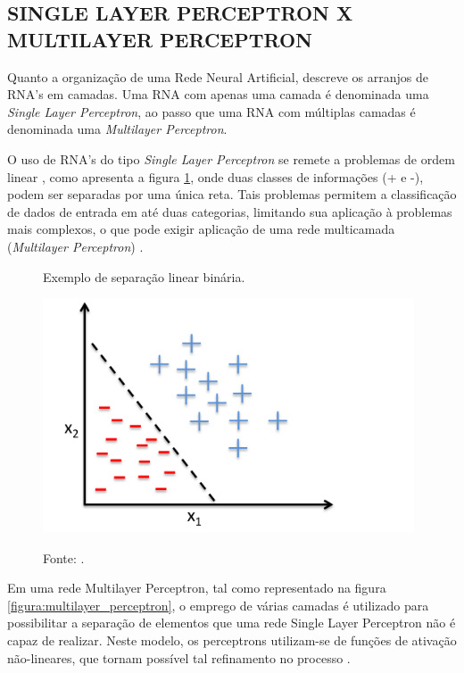 \subsection{SINGLE LAYER PERCEPTRON X MULTILAYER PERCEPTRON}

Quanto a organização de uma Rede Neural Artificial,  descreve os arranjos de RNA's em camadas. Uma RNA com apenas uma camada é denominada uma \textit{Single Layer Perceptron}, ao passo que uma RNA com múltiplas camadas é denominada uma \textit{Multilayer Perceptron}.

O uso de RNA's do tipo \textit{Single Layer Perceptron} se remete a problemas de ordem linear \cite{haykin2009neural}, como apresenta a figura \ref{figura:perceptron_binary}, onde duas classes de informações (+ e -), podem ser separadas por uma única reta. Tais problemas permitem a classificação de dados de entrada em até duas categorias, limitando sua aplicação à problemas mais complexos, o que pode exigir aplicação de uma rede multicamada (\textit{Multilayer Perceptron}) \cite{fausett1994fundamentals}.

\begin{figure}[H]
	\caption{Exemplo de separação linear binária.}
	\centering %
	\includegraphics[width=11cm]{resources/perceptron_binary.png} %
	\label{figura:perceptron_binary}
	\captionsetup{singlelinecheck = false, format= hang, justification=raggedright, labelsep=space, width=11cm}
	\caption*{\footnotesize Fonte: .}
\end{figure}

Em uma rede Multilayer Perceptron, tal como representado na figura \ref{figura:multilayer_perceptron}, o emprego de várias camadas é utilizado para possibilitar a separação de elementos que uma rede Single Layer Perceptron não é capaz de realizar. Neste modelo, os perceptrons utilizam-se de funções de ativação não-lineares, que tornam possível tal refinamento no processo \cite{marius2009}.

